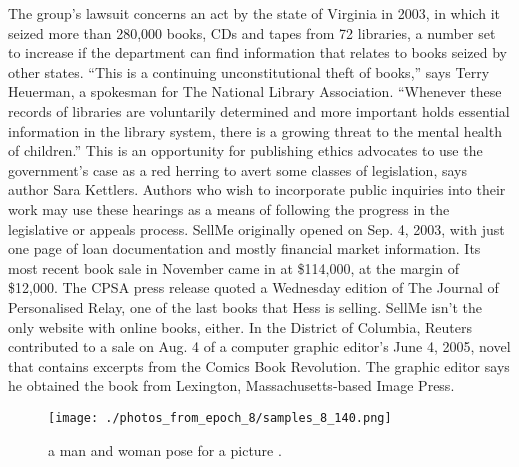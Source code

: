 \documentclass{article}%
\begin{document}
The group’s lawsuit concerns an act by the state of Virginia in 2003, in which it seized more than 280,000 books, CDs and tapes from 72 libraries, a number set to increase if the department can find information that relates to books seized by other states.\newline%
“This is a continuing unconstitutional theft of books,” says Terry Heuerman, a spokesman for The National Library Association. “Whenever these records of libraries are voluntarily determined and more important holds essential information in the library system, there is a growing threat to the mental health of children.”\newline%
This is an opportunity for publishing ethics advocates to use the government's case as a red herring to avert some classes of legislation, says author Sara Kettlers. Authors who wish to incorporate public inquiries into their work may use these hearings as a means of following the progress in the legislative or appeals process.\newline%
SellMe originally opened on Sep. 4, 2003, with just one page of loan documentation and mostly financial market information. Its most recent book sale in November came in at \$114,000, at the margin of \$12,000.\newline%
The CPSA press release quoted a Wednesday edition of The Journal of Personalised Relay, one of the last books that Hess is selling.\newline%
SellMe isn’t the only website with online books, either. In the District of Columbia, Reuters contributed to a sale on Aug. 4 of a computer graphic editor’s June 4, 2005, novel that contains excerpts from the Comics Book Revolution. The graphic editor says he obtained the book from Lexington, Massachusetts{-}based Image Press.\newline%

%


\begin{figure}[h!]%
\centering%
\texttt{[image: ./photos\_from\_epoch\_8/samples\_8\_140.png]}%
\caption{a man and woman pose for a picture .}%
\end{figure}

%
\end{document}

